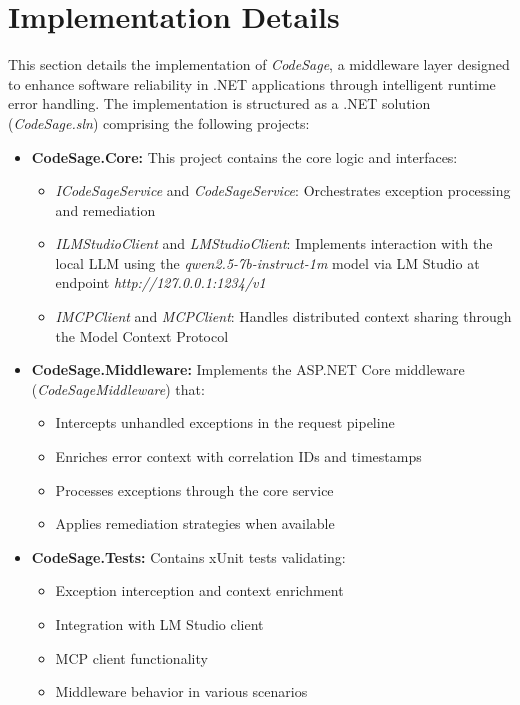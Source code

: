 \section{Implementation Details}

This section details the implementation of \textit{CodeSage}, a middleware layer designed to enhance software reliability in .NET applications through intelligent runtime error handling. The implementation is structured as a .NET solution (\textit{CodeSage.sln}) comprising the following projects:

\begin{itemize}
\item \textbf{CodeSage.Core:} This project contains the core logic and interfaces:
  \begin{itemize}
    \item \textit{ICodeSageService} and \textit{CodeSageService}: Orchestrates exception processing and remediation
    \item \textit{ILMStudioClient} and \textit{LMStudioClient}: Implements interaction with the local LLM using the \textit{qwen2.5-7b-instruct-1m} model via LM Studio at endpoint \textit{http://127.0.0.1:1234/v1}
    \item \textit{IMCPClient} and \textit{MCPClient}: Handles distributed context sharing through the Model Context Protocol
  \end{itemize}
\item \textbf{CodeSage.Middleware:} Implements the ASP.NET Core middleware (\textit{CodeSageMiddleware}) that:
  \begin{itemize}
    \item Intercepts unhandled exceptions in the request pipeline
    \item Enriches error context with correlation IDs and timestamps
    \item Processes exceptions through the core service
    \item Applies remediation strategies when available
  \end{itemize}
\item \textbf{CodeSage.Tests:} Contains xUnit tests validating:
  \begin{itemize}
    \item Exception interception and context enrichment
    \item Integration with LM Studio client
    \item MCP client functionality
    \item Middleware behavior in various scenarios

\end{itemize}
\end{itemize}
